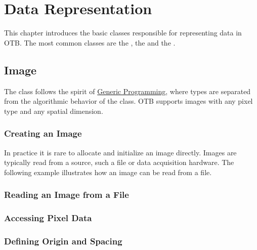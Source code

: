 \chapter{Data Representation}
\label{sec:DataRepresentation}


This chapter introduces the basic classes responsible
for representing data in OTB. The most common classes are the
, the  and the .

\section{Image}
\label{sec:ImageSection}

The  class follows the spirit of
\href{http://www.boost.org/more/generic_programming.html}{Generic
Programming}, where types are separated from the algorithmic behavior
of the class.  OTB supports images with any pixel type and any spatial
dimension.

\subsection{Creating an Image}\label{sec:CreatingAnImageSection}



In practice it is rare to allocate and initialize an image directly.
Images are typically read from a source, such a file or data acquisition
hardware. The following example illustrates how an image can be read from
a file.




\subsection{Reading an Image from a File}
\label{sec:ReadingImageFromFile}







\subsection{Accessing Pixel Data}
\label{sec:AccessingImagePixelData}






\subsection{Defining Origin and Spacing}
\label{sec:DefiningImageOriginAndSpacing}

